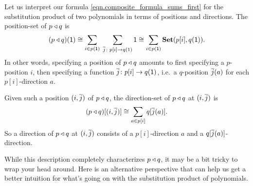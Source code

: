 \documentclass[Book-Poly]{subfiles}
\begin{document}
Let us interpret our formula \eqref{eqn.composite_formula_sums_first} for the substitution product of two polynomials in terms of positions and directions.
The position-set of $p \mathbin{\triangleleft} q$ is
\begin{equation} \label{eqn.comp_pos}
    (p \mathbin{\triangleleft} q)(\textsf{1}) \cong \sum_{i \in p(\textsf{1})} \; \sum_{\overline{j} \colon p[i] \to q(1)} \textsf{1} \cong \sum_{i \in p(\textsf{1})} \mathbf{Set}(p[i], q(\textsf{1})).
\end{equation}
In other words, specifying a position of $p \mathbin{\triangleleft} q$ amounts to first specifying a $p$-position $i$, then specifying a function $\overline{j} \colon p[i] \to q(\textsf{1})$, i.e.\ a $q$-position $\overline{j}(a)$ for each $p[i]$-direction $a$.

Given such a position $(i, \overline{j})$ of $p \mathbin{\triangleleft} q$, the direction-set of $p \mathbin{\triangleleft} q$ at $(i, \overline{j})$ is
\begin{equation} \label{eqn.comp_dir}
    (p \mathbin{\triangleleft} q)[(i, \overline{j})] \cong \sum_{a \in p[i]} q[\overline{j}(a)].
\end{equation}
So a direction of $p \mathbin{\triangleleft} q$ at $(i, \overline{j})$ consists of a $p[i]$-direction $a$ and a $q[\overline{j}(a)]$-direction.

While this description completely characterizes $p \mathbin{\triangleleft} q$, it may be a bit tricky to wrap your head around.
Here is an alternative perspective that can help us get a better intuition for what's going on with the substitution product of polynomials.
\end{document}
